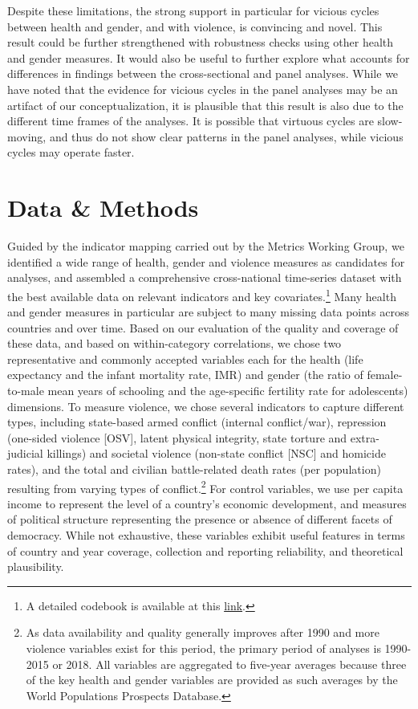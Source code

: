 \documentclass[12pt]{article}
\begin{document}
Despite these limitations, the strong support in particular for vicious cycles between health and gender, and with violence, is convincing and novel.
This result could be further strengthened with robustness checks using other health and gender measures.
It would also be useful to further explore what accounts for differences in findings between the cross-sectional and panel analyses.
While we have noted that the evidence for vicious cycles in the panel analyses may be an artifact of our conceptualization, it is plausible that this result is also due to the different time frames of the analyses. It is possible that virtuous cycles are slow-moving, and thus do not show clear patterns in the panel analyses, while vicious cycles may operate faster.


\section{Data \& Methods}


Guided by the indicator mapping carried out by the Metrics Working Group, we identified a wide range of health, gender and violence measures as candidates for analyses, and assembled a comprehensive cross-national time-series dataset with the best available data on relevant indicators and key covariates.\footnote{A detailed codebook is available at this \href{https://docs.google.com/spreadsheets/d/1KLFTva--XHVBM-IX6qaPtuyzmIlRMnpyjUXfBdJPsag/edit?usp=sharing}{link}.} Many health and gender measures in particular are subject to many missing data points across countries and over time.
Based on our evaluation of the quality and coverage of these data, and based on within-category correlations, we chose two representative and commonly accepted variables each for the health (life expectancy and the infant mortality rate, IMR) and gender (the ratio of female-to-male mean years of schooling and the age-specific fertility rate for adolescents) dimensions.
To measure violence, we chose several indicators to capture different types, including state-based armed conflict (internal conflict/war), repression (one-sided violence [OSV], latent physical integrity, state torture and extra-judicial killings) and societal violence (non-state conflict [NSC] and homicide rates), and the total and civilian battle-related death rates (per population) resulting from varying types of conflict.\footnote{As data availability and quality generally improves after 1990 and more violence variables exist for this period, the primary period of analyses is 1990-2015 or 2018. All variables are aggregated to five-year averages because three of the key health and gender variables are provided as such averages by the World Populations Prospects Database.}
For control variables, we use per capita income to represent the level of a country's economic development, and measures of political structure representing the presence or absence of different facets of democracy.
While not exhaustive, these variables exhibit useful features in terms of country and year coverage, collection and reporting reliability, and theoretical plausibility.
\end{document}
